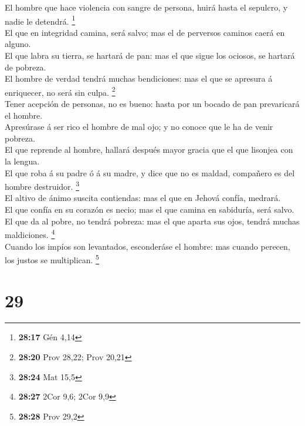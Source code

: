  El hombre que hace violencia con sangre de persona, huirá
hasta el sepulcro, y nadie le detendrá. \footnote{\textbf{28:17} Gén
  4,14}\\
 El que en integridad camina, será salvo; mas el de
perversos caminos caerá en alguno.\\
 El que labra su tierra, se hartará de pan: mas el que
sigue los ociosos, se hartará de pobreza.\\
 El hombre de verdad tendrá muchas bendiciones: mas el que
se apresura á enriquecer, no será sin culpa. \footnote{\textbf{28:20}
  Prov 28,22; Prov 20,21}\\
 Tener acepción de personas, no es bueno: hasta por un
bocado de pan prevaricará el hombre.\\
 Apresúrase á ser rico el hombre de mal ojo; y no conoce
que le ha de venir pobreza.\\
 El que reprende al hombre, hallará después mayor gracia
que el que lisonjea con la lengua.\\
 El que roba á su padre ó á su madre, y dice que no es
maldad, compañero es del hombre destruidor. \footnote{\textbf{28:24} Mat
  15,5}\\
 El altivo de ánimo suscita contiendas: mas el que en
Jehová confía, medrará.\\
 El que confía en su corazón es necio; mas el que camina en
sabiduría, será salvo.\\
 El que da al pobre, no tendrá pobreza: mas el que aparta
sus ojos, tendrá muchas maldiciones. \footnote{\textbf{28:27} 2Cor 9,6;
  2Cor 9,9}\\
 Cuando los impíos son levantados, esconderáse el hombre:
mas cuando perecen, los justos se multiplican. \footnote{\textbf{28:28}
  Prov 29,2}

\hypertarget{section-28}{%
\section{29}\label{section-28}}

